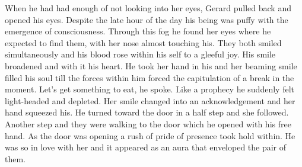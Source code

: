 

When he had had enough of not looking into her eyes, Gerard pulled
back and opened his eyes.  Despite the late hour of the day his being
was puffy with the emergence of consciousness.  Through this fog he
found her eyes where he expected to find them, with her nose almost
touching his.  They both smiled simultaneously and his blood rose
within his self to a gleeful joy.  His smile broadened and with it his
heart.  He took her hand in his and her beaming smile filled his soul
till the forces within him forced the capitulation of a break in the
moment.  Let's get something to eat, he spoke.  Like a prophecy he
suddenly felt light-headed and depleted.  Her smile changed into an
acknowledgement and her hand squeezed his.  He turned toward the door
in a half step and she followed.  Another step and they were walking
to the door which he opened with his free hand.  As the door was
opening a rush of pride of presence took hold within.  He was so in
love with her and it appeared as an aura that enveloped the pair of
them.

\bye
